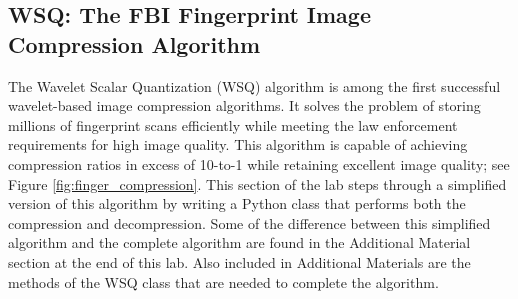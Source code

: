 
\subsection*{WSQ: The FBI Fingerprint Image Compression Algorithm} %

The Wavelet Scalar Quantization (WSQ) algorithm is among the first successful wavelet-based image compression algorithms.
It solves the problem of storing millions of fingerprint scans efficiently while meeting the law enforcement requirements for high image quality.
This algorithm is capable of achieving compression ratios in excess of 10-to-1 while retaining excellent image quality; see Figure \ref{fig:finger_compression}.
This section of the lab steps through a simplified version of this algorithm by writing a Python class that performs both the compression and decompression.
Some of the difference between this simplified algorithm and the complete algorithm are found in the Additional Material section at the end of this lab.
Also included in Additional Materials are the methods of the WSQ class that are needed to complete the algorithm.

